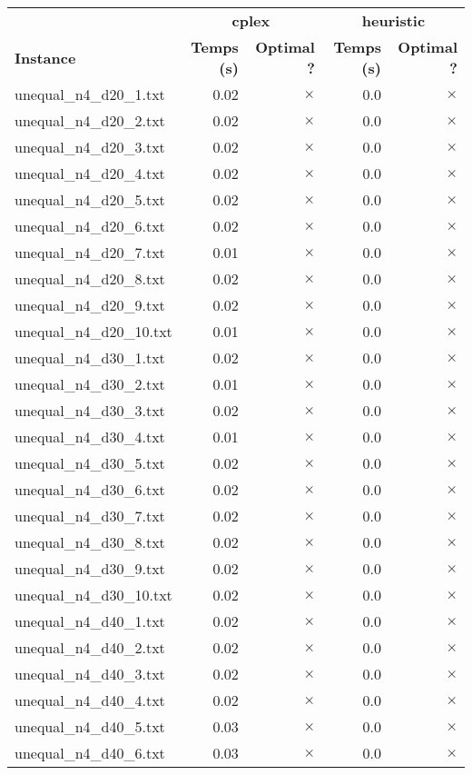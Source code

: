 \documentclass{article}
\begin{document}
\begin{center}
\renewcommand{\arraystretch}{1.4} 
 \begin{tabular}{lrrrr}
	\hline
 & \multicolumn{2}{c}{\textbf{cplex}} & \multicolumn{2}{c}{\textbf{heuristic}}\\
\textbf{Instance}  & \textbf{Temps (s)} & \textbf{Optimal ?}  & \textbf{Temps (s)} & \textbf{Optimal ?} \\\hline

unequal\_n4\_d20\_1.txt & 0.02 & 
$\times$
 & 0.0 & 
$\times$
\\
unequal\_n4\_d20\_2.txt & 0.02 & 
$\times$
 & 0.0 & 
$\times$
\\
unequal\_n4\_d20\_3.txt & 0.02 & 
$\times$
 & 0.0 & 
$\times$
\\
unequal\_n4\_d20\_4.txt & 0.02 & 
$\times$
 & 0.0 & 
$\times$
\\
unequal\_n4\_d20\_5.txt & 0.02 & 
$\times$
 & 0.0 & 
$\times$
\\
unequal\_n4\_d20\_6.txt & 0.02 & 
$\times$
 & 0.0 & 
$\times$
\\
unequal\_n4\_d20\_7.txt & 0.01 & 
$\times$
 & 0.0 & 
$\times$
\\
unequal\_n4\_d20\_8.txt & 0.02 & 
$\times$
 & 0.0 & 
$\times$
\\
unequal\_n4\_d20\_9.txt & 0.02 & 
$\times$
 & 0.0 & 
$\times$
\\
unequal\_n4\_d20\_10.txt & 0.01 & 
$\times$
 & 0.0 & 
$\times$
\\
unequal\_n4\_d30\_1.txt & 0.02 & 
$\times$
 & 0.0 & 
$\times$
\\
unequal\_n4\_d30\_2.txt & 0.01 & 
$\times$
 & 0.0 & 
$\times$
\\
unequal\_n4\_d30\_3.txt & 0.02 & 
$\times$
 & 0.0 & 
$\times$
\\
unequal\_n4\_d30\_4.txt & 0.01 & 
$\times$
 & 0.0 & 
$\times$
\\
unequal\_n4\_d30\_5.txt & 0.02 & 
$\times$
 & 0.0 & 
$\times$
\\
unequal\_n4\_d30\_6.txt & 0.02 & 
$\times$
 & 0.0 & 
$\times$
\\
unequal\_n4\_d30\_7.txt & 0.02 & 
$\times$
 & 0.0 & 
$\times$
\\
unequal\_n4\_d30\_8.txt & 0.02 & 
$\times$
 & 0.0 & 
$\times$
\\
unequal\_n4\_d30\_9.txt & 0.02 & 
$\times$
 & 0.0 & 
$\times$
\\
unequal\_n4\_d30\_10.txt & 0.02 & 
$\times$
 & 0.0 & 
$\times$
\\
unequal\_n4\_d40\_1.txt & 0.02 & 
$\times$
 & 0.0 & 
$\times$
\\
unequal\_n4\_d40\_2.txt & 0.02 & 
$\times$
 & 0.0 & 
$\times$
\\
unequal\_n4\_d40\_3.txt & 0.02 & 
$\times$
 & 0.0 & 
$\times$
\\
unequal\_n4\_d40\_4.txt & 0.02 & 
$\times$
 & 0.0 & 
$\times$
\\
unequal\_n4\_d40\_5.txt & 0.03 & 
$\times$
 & 0.0 & 
$\times$
\\
unequal\_n4\_d40\_6.txt & 0.03 & 
$\times$
 & 0.0 & 
$\times$
\\
\hline\end{tabular}
\end{center}
\end{document}
